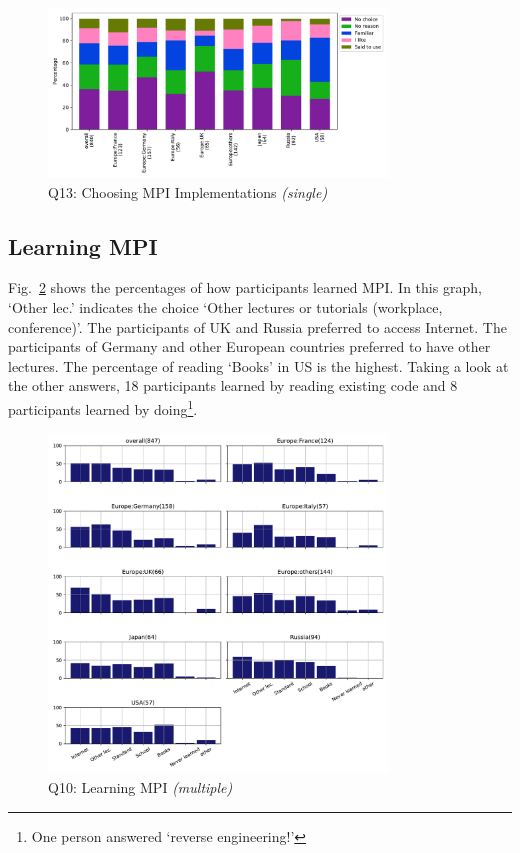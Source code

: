 \documentclass[conference,10pt,letterpaper]{IEEEtran}
\def\myquote#1{`#1'}
\begin{document}
\begin{figure}[htb]
\begin{center}
\includegraphics[width=9cm]{Figs/Q13.pdf}
\caption{Q13: Choosing MPI Implementations {\it(single)}}
\label{fig:choosing-implementation}
\end{center}
\end{figure}

\subsection{Learning MPI}

Fig.~\ref{fig:learning-mpi} shows the percentages of how participants
learned MPI. In this graph, \myquote{Other lec.} indicates the choice
\myquote{Other lectures or tutorials (workplace, conference)}. The
participants of UK and Russia preferred to access Internet. The
participants of Germany and other European countries preferred to have
other lectures. The percentage of reading \myquote{Books} in US is the
highest. Taking a look at the other answers, 18 participants learned
by reading existing code and 8 participants learned by
doing\footnote{One person answered \myquote{reverse engineering!}}. 

\begin{figure}[htb]
\begin{center}
\includegraphics[width=9cm]{Figs/Q10.pdf}
\caption{Q10: Learning MPI {\it(multiple)}}
\label{fig:learning-mpi}
\end{center}
\end{figure}
\end{document}
